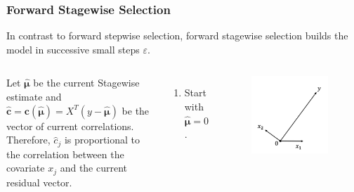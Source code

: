 \begin{frame}
\frametitle{Forward Stagewise Selection}
In contrast to forward stepwise selection, forward stagewise selection builds the model in successive small steps $\varepsilon$.

\begin{columns}
    Let $\hat{\mathbf{\mu}}$ be the current Stagewise estimate and $\hat{\mathbf{c}}=\mathbf{c}(\hat{\mathbf{\mu}})=X^T(y-\hat{\mathbf{\mu}})$ be the vector of current correlations. Therefore, $\hat{c}_j$ is proportional to the correlation between the covariate $x_j$ and the current residual vector.
    \begin{enumerate}
        \item Start with $\hat{\mathbf{\mu}}=0$.
    \end{enumerate}
    
    \begin{figure}[!htbp]
        \begin{center}
            \includegraphics[width=0.95\textwidth]{img/FStageR/1.jpeg}
        \end{center}
    \end{figure}
\end{columns}
\end{frame}

